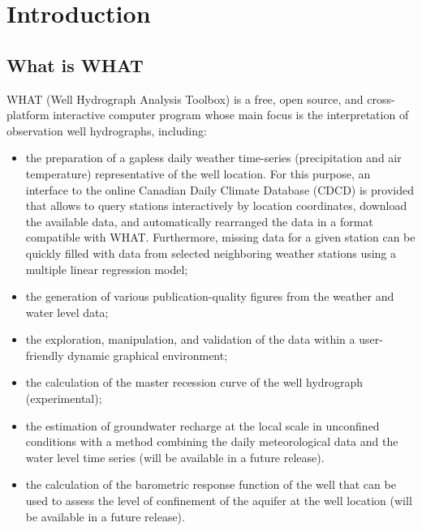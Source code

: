 \documentclass[WHATMANUAL.tex]{subfiles}
\begin{document}
\chapter{Introduction}

\section{What is WHAT}

WHAT (Well Hydrograph Analysis Toolbox) is a free, open source, and cross-platform interactive computer program whose main focus is the interpretation of observation well hydrographs, including:

\begin{itemize}

\item the preparation of a gapless daily weather time-series (precipitation and air temperature) representative of the well location. For this purpose, an interface to the online Canadian Daily Climate Database (CDCD) is provided that allows to query stations interactively by location coordinates, download the available data, and automatically rearranged the data in a format compatible with WHAT. Furthermore, missing data for a given station can be quickly filled with data from selected neighboring weather stations using a multiple linear regression model;

\item the generation of various publication-quality figures from the weather and water level data;

\item the exploration, manipulation, and validation of the data within a user-friendly dynamic graphical environment;

\item the calculation of the master recession curve of the well hydrograph (experimental);

\item the estimation of groundwater recharge at the local scale in unconfined conditions with a method combining the daily meteorological data and the water level time series (will be available in a future release).

\item the calculation of the barometric response function of the well that can be used to assess the level of confinement of the aquifer at the well location (will be available in a future release).

\end{itemize}
\end{document}
